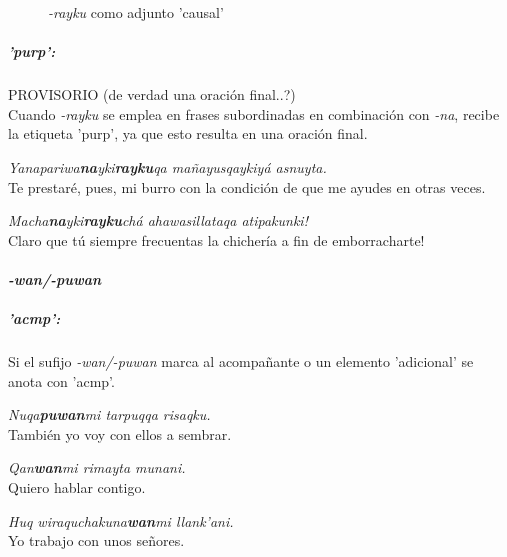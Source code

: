 \documentclass[a4paper,11pt,DIV12]{scrartcl}
\begin{document}
\begin{figure}
 \begin{center}
\caption{{\em -rayku} como adjunto 'causal' }\label{Fig:raykucaus}
 \end{center}
\end{figure}

\subparagraph{'purp':}\label{Sec:raykupurp}
PROVISORIO (de verdad una oraci\'on final..?)\\
Cuando {\em -rayku} se emplea en frases subordinadas en combinaci\'on con {\em -na}, recibe la etiqueta 'purp', ya que esto resulta en una oraci\'on final.

\begin{examples}
 \item {\em Yanapariwa\textbf{na}yki\textbf{rayku}qa ma\~nayusqaykiy\'a asnuyta.}\\
      Te prestar\'e, pues, mi burro con la condici\'on de que me ayudes en otras veces.
 \item {\em Macha\textbf{na}yki\textbf{rayku}ch\'a ahawasillataqa atipakunki!}\\
      {\textexclamdown}Claro que t\'u siempre frecuentas la chicher\'ia a fin de emborracharte!\\
 \hfill {\small \citep[131]{Cusi2}}
\end{examples}



\paragraph{{\em -wan/-puwan}}

\subparagraph{'acmp':}
 Si el sufijo {\em -wan/-puwan} marca al acompa\~nante o un elemento 'adicional' se anota con 'acmp'.
\begin{examples}
 \item {\em Nuqa\textbf{puwan}mi tarpuqqa risaqku.}\\
      Tambi\'en yo voy con ellos a sembrar.
  \item {\em Qan\textbf{wan}mi rimayta munani.}\\
      Quiero hablar contigo.
\item {\em Huq wiraquchakuna\textbf{wan}mi llank'ani.}\\
      Yo trabajo con unos se\~nores.\\
 \hfill {\small \citep[126-127]{Cusi2}}
\end{examples}
\end{document}
